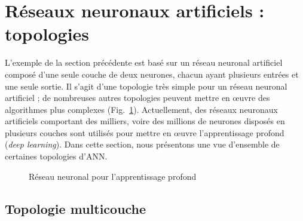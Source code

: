 \section{Réseaux neuronaux artificiels : topologies}\label{s.ann-topology}

L'exemple de la section précédente est basé sur un réseau neuronal artificiel composé d'une seule couche de deux neurones, chacun ayant plusieurs entrées et une seule sortie. Il s'agit d'une topologie très simple pour un réseau neuronal artificiel ; de nombreuses autres topologies peuvent mettre en œuvre des algorithmes plus complexes (Fig.~\ref{fig.nn-deep}). Actuellement, des réseaux neuronaux artificiels comportant des milliers, voire des millions de neurones disposés en plusieurs couches sont utilisés pour mettre en œuvre l'apprentissage profond (\emph{deep learning}). Dans cette section, nous présentons une vue d'ensemble de certaines topologies d'ANN.

\begin{figure}
\begin{center}
\caption{Réseau neuronal pour l'apprentissage profond}\label{fig.nn-deep}
\end{center}
\end{figure}

\subsection{Topologie multicouche}

